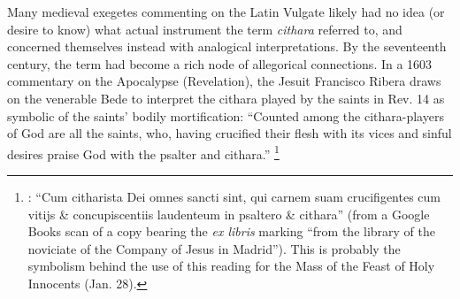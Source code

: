 \documentclass[11pt]{article}
\begin{document}
Many medieval exegetes commenting on the Latin Vulgate likely had no idea (or desire to know) what actual instrument the term \emph{cithara} referred to, and concerned themselves instead with analogical interpretations.
By the seventeenth century, the term had become a rich node of allegorical connections.
In a 1603 commentary on the Apocalypse (Revelation), the Jesuit Francisco Ribera draws on the venerable Bede to interpret the cithara played by the saints in Rev. 14 as symbolic of the saints' bodily mortification: 
``Counted among the cithara-players of God are all the saints, who, having crucified their flesh with its vices and sinful desires praise God with the psalter and cithara.''%
	\footnote{
	\autocite[429]{Ribera:Apocalypse}: ``Cum citharista Dei omnes sancti sint, qui carnem suam crucifigentes cum vitijs \& concupiscentiis laudenteum in psaltero \& cithara'' (from a Google Books scan of a copy bearing the \emph{ex libris} marking ``from the library of the noviciate of the Company of Jesus in Madrid'').
This is probably the symbolism behind the use of this reading for the Mass of the Feast of Holy Innocents (Jan. 28).
	} 
\end{document}
